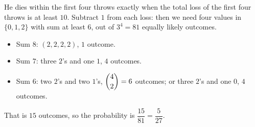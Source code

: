 He dies within the first four throws exactly when the total loss of the first four throws is at least $10$. Subtract $1$ from each loss: then we need four values in $\{0,1,2\}$ with sum at least $6$, out of $3^4=81$ equally likely outcomes.
\begin{itemize}
\item Sum $8$: $(2,2,2,2)$, $1$ outcome.
\item Sum $7$: three $2$'s and one $1$, $4$ outcomes.
\item Sum $6$: two $2$'s and two $1$'s, $\dbinom42=6$ outcomes; or three $2$'s and one $0$, $4$ outcomes.
\end{itemize}
That is $15$ outcomes, so the probability is $\dfrac{15}{81}=\boxed{\dfrac5{27}}$.
